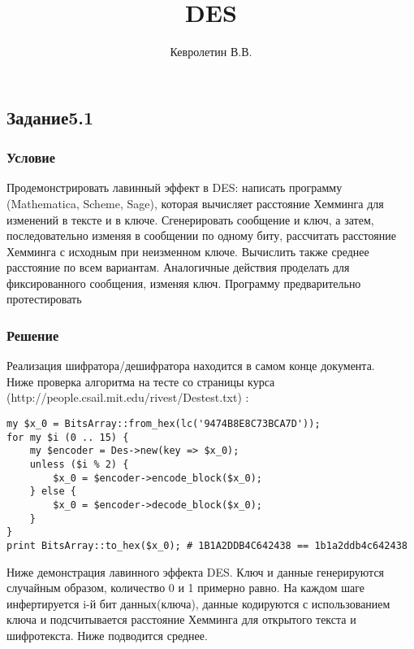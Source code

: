 \documentclass[10pt,a4paper]{article}
\author{Кевролетин В.В.}
\title{DES}
\begin{document}
\maketitle

\subsection*{Задание5.1}
\subsubsection*{Условие}
Продемонстрировать лавинный эффект в DES: написать программу
(Mathematica, Scheme, Sage), которая вычисляет расстояние Хемминга для
изменений в тексте и в ключе. Сгенерировать сообщение и ключ, а затем,
последовательно изменяя в сообщении по одному биту, рассчитать
расстояние Хемминга с исходным при неизменном ключе. Вычислить также
среднее расстояние по всем вариантам. Аналогичные действия проделать
для фиксированного сообщения, изменяя ключ. Программу предварительно
протестировать
\subsubsection*{Решение}

Реализация шифратора/дешифратора находится в самом конце документа. \\
Ниже проверка алгоритма на тесте со страницы курса 
(http://people.csail.mit.edu/rivest/Destest.txt) :
\begin{lstlisting}
my $x_0 = BitsArray::from_hex(lc('9474B8E8C73BCA7D'));
for my $i (0 .. 15) {
    my $encoder = Des->new(key => $x_0);
    unless ($i % 2) {
        $x_0 = $encoder->encode_block($x_0);
    } else {
        $x_0 = $encoder->decode_block($x_0);
    }
}
print BitsArray::to_hex($x_0); # 1B1A2DDB4C642438 == 1b1a2ddb4c642438
\end{lstlisting}

Ниже демонстрация лавинного эффекта DES. Ключ и данные генерируются
случайным образом, количество 0 и 1 примерно равно. На каждом
шаге инфертируется i-й бит данных(ключа), данные кодируются с
использованием ключа и подсчитывается
расстояние Хемминга для открытого текста и шифротекста. Ниже
подводится среднее.
\end{document}
